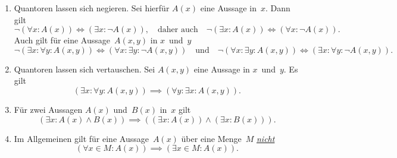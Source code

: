 \documentclass[a4paper]{article}
\begin{document}
\begin{theorem}\leavevmode
    \begin{enumerate}
        \item Quantoren lassen sich negieren. Sei hierfür $A(x)$ eine Aussage in~$x$. Dann gilt
              \begin{equation*}
                  \neg (\forall x\colon A(x)) \iff (\exists x\colon \neg A(x)), \quad\text{daher auch}\quad \neg (\exists x\colon A(x)) \iff (\forall x\colon \neg A(x)).
              \end{equation*}
              Auch gilt für eine Aussage~$A(x, y)$ in $x$~und~$y$
              \begin{equation*}
                  \neg (\exists x\colon \forall y\colon A(x, y)) \iff (\forall x\colon \exists y\colon \neg A(x, y)) \quad\text{und}\quad \neg (\forall x\colon \exists y\colon A(x, y)) \iff (\exists x\colon \forall y\colon \neg A(x, y)).
              \end{equation*}
        \item Quantoren lassen sich vertauschen. Sei $A(x, y)$ eine Aussage in $x$~und~$y$. Es gilt
              \begin{equation*}
                  (\exists x\colon \forall y\colon A(x, y)) \implies (\forall y\colon \exists x\colon A(x, y)).
              \end{equation*}
        \item Für zwei Aussagen $A(x)$ und~$B(x)$ in~$x$ gilt
              \begin{equation*}
                  (\exists x\colon A(x) \wedge B(x)) \implies ((\exists x\colon A(x)) \wedge (\exists x\colon B(x))).
              \end{equation*}
        \item Im Allgemeinen gilt für eine Aussage~$A(x)$ über eine Menge~$M$ \underline{\emph{nicht}}
              \begin{equation*}
                  (\forall x \in M\colon A(x)) \implies (\exists x \in M\colon A(x)).
              \end{equation*}
    \end{enumerate}
\end{theorem}
\end{document}
